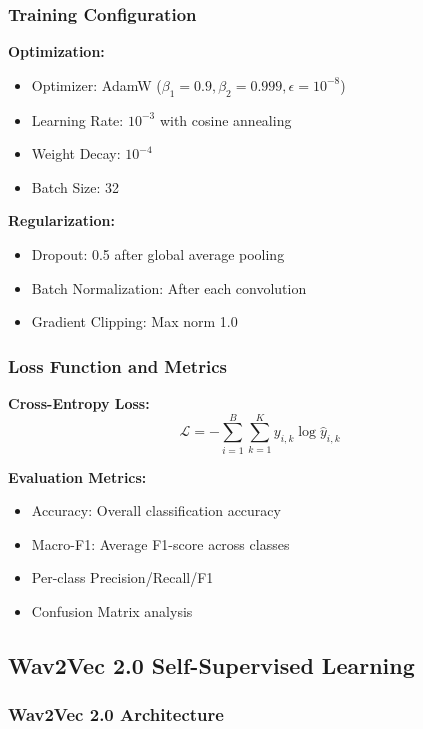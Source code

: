 \documentclass[conference]{IEEEtran}
\begin{document}
\subsubsection{Training Configuration}
\label{sec:q2_cnn_training}

\textbf{Optimization:}
\begin{itemize}
  \item Optimizer: AdamW ($\beta_1=0.9, \beta_2=0.999, \epsilon=10^{-8}$)
  \item Learning Rate: $10^{-3}$ with cosine annealing
  \item Weight Decay: $10^{-4}$
  \item Batch Size: 32
\end{itemize}

\textbf{Regularization:}
\begin{itemize}
  \item Dropout: 0.5 after global average pooling
  \item Batch Normalization: After each convolution
  \item Gradient Clipping: Max norm 1.0
\end{itemize}

\subsubsection{Loss Function and Metrics}
\label{sec:q2_cnn_loss}

\textbf{Cross-Entropy Loss:}
\begin{equation}
\mathcal{L} = -\sum_{i=1}^{B} \sum_{k=1}^{K} y_{i,k} \log \hat{y}_{i,k}
\end{equation}

\textbf{Evaluation Metrics:}
\begin{itemize}
  \item Accuracy: Overall classification accuracy
  \item Macro-F1: Average F1-score across classes
  \item Per-class Precision/Recall/F1
  \item Confusion Matrix analysis
\end{itemize}

\subsection{Wav2Vec 2.0 Self-Supervised Learning}
\label{sec:q2_wav2vec}

\subsubsection{Wav2Vec 2.0 Architecture}
\label{sec:q2_wav2vec_architecture}
\end{document}
